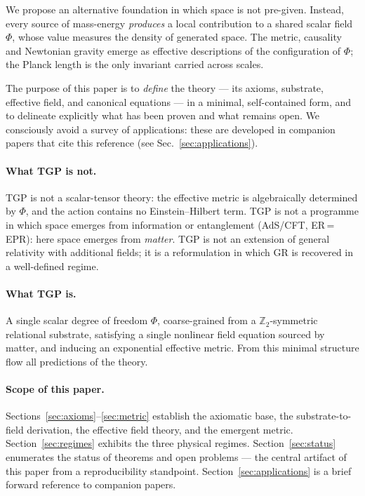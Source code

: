 \documentclass[11pt,a4paper]{article}
\renewcommand{\Phi}{\varPhi}
\newcommand{\Zp}{\mathbb{Z}_{2}}
\begin{document}
We propose an alternative foundation in which space is not pre-given.
Instead, every source of mass-energy \emph{produces} a local contribution
to a shared scalar field $\Phi$, whose value measures the density of generated
space. The metric, causality and Newtonian gravity emerge as effective
descriptions of the configuration of $\Phi$; the Planck length is the only
invariant carried across scales.

The purpose of this paper is to \emph{define} the theory --- its axioms,
substrate, effective field, and canonical equations --- in a minimal,
self-contained form, and to delineate explicitly what has been proven and
what remains open. We consciously avoid a survey of applications: these are
developed in companion papers that cite this reference (see
Sec.~\ref{sec:applications}).

\paragraph{What TGP is not.} TGP is not a scalar-tensor theory: the
effective metric is algebraically determined by $\Phi$, and the action
contains no Einstein--Hilbert term. TGP is not a programme in which space
emerges from information or entanglement (AdS/CFT, ER\,=\,EPR): here space
emerges from \emph{matter}. TGP is not an extension of general relativity
with additional fields; it is a reformulation in which GR is recovered in
a well-defined regime.

\paragraph{What TGP is.} A single scalar degree of freedom $\Phi$,
coarse-grained from a $\Zp$-symmetric relational substrate, satisfying a
single nonlinear field equation sourced by matter, and inducing an
exponential effective metric. From this minimal structure flow all
predictions of the theory.

\paragraph{Scope of this paper.} Sections~\ref{sec:axioms}--\ref{sec:metric}
establish the axiomatic base, the substrate-to-field derivation, the
effective field theory, and the emergent metric. Section~\ref{sec:regimes}
exhibits the three physical regimes. Section~\ref{sec:status} enumerates the
status of theorems and open problems --- the central artifact of this paper
from a reproducibility standpoint. Section~\ref{sec:applications} is a brief
forward reference to companion papers.
\end{document}
